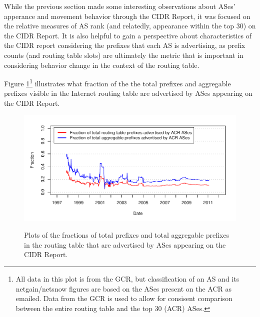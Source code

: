 
While the previous section made some interesting observations about ASes'
apperance and movement behavior through the CIDR Report, it was focused on the
relative measures of AS rank (and relatedly, appearance within the top 30) on
the CIDR Report. It is also helpful to gain a perspective about characteristics
of the CIDR report considering the prefixes that each AS is advertising, as
prefix counts (and routing table slots) are ultimately the metric that is
important in considering behavior change in the context of the routing table.

Figure \ref{fig:netcompare}\footnote{All data in this plot is from the GCR, but
classification of an AS and its netgain/netsnow figures are based on the ASes
present on the ACR as emailed. Data from the GCR is used to allow for consisent
comparison between the entire routing table and the top 30 (ACR) ASes.}
illustrates what fraction of the the total prefixes and aggregable prefixes
visible in the Internet routing table are advertised by ASes appearing on the
CIDR Report.

\begin{figure}[h!]
\begin{centering}
\begin{singlespace}
    \includegraphics[width=6in]{figures/acr_gcr_netcompare2.pdf}
    \vspace{-2em}\\
    \caption{Plots of the fractions of total prefixes and total aggregable
    prefixes in the routing table that are advertised by ASes appearing on the
    CIDR Report.}
    \label{fig:netcompare}
\end{singlespace}
\end{centering}
\end{figure}

